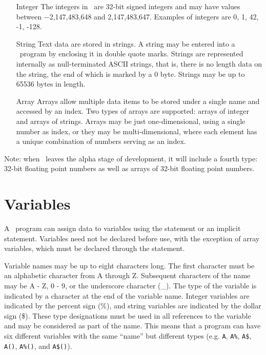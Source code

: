 \documentclass{article}
\begin{document}
    \begin{itemize}
        \item[Integer]  The integers in \BASIC\ are 32-bit signed integers and may have values between −2,147,483,648 and 2,147,483,647.
                        Examples of integers are 0, 1, 42, -1, -128.

        \item[String]   Text data are stored in strings. A string may be entered into a \BASIC\ program by enclosing it in double quote marks.
                        Strings are represented internally as null-terminated ASCII strings, that is, there is no length data on the string,
                        the end of which is marked by a 0 byte.
                        Strings may be up to 65536 bytes in length.
                        
        \item[Array]    Arrays allow multiple data items to be stored under a single name and accessed by an index.
                        Two types of arrays are supported: arrays of integer and arrays of strings.
                        Arrays may be just one-dimensional, using a single number as index, or they may be multi-dimensional,
                        where each element has a unique combination of numbers serving as an index.
    \end{itemize}

    Note: when \BASIC\ leaves the alpha stage of development, it will include a fourth type: 32-bit floating point numbers as well
    as arrays of 32-bit floating point numbers.

    \section{Variables}

    A \BASIC\ program can assign data to variables using the  statement or an implicit  statement.
    Variables need not be declared before use, with the exception of array variables, which must be declared through the
     statement.

    Variable names may be up to eight characters long. The first character must be an alphabetic character from A through Z.
    Subsequent characters of the name may be A - Z, 0 - 9, or the underscore character (\_). The type of the variable is indicated
    by a character at the end of the variable name. Integer variables are indicated by the percent sign (\%), and string
    variables are indicated by the dollar sign (\$). These type designations must be used in all references to the variable and may
    be considered as part of the name. This means that a program can have six different variables with the same ``name'' but different
    types (e.g. \verb+A+, \verb+A%+, \verb+A$+, \verb+A()+, \verb+A%()+, and \verb+A$()+).
\end{document}
